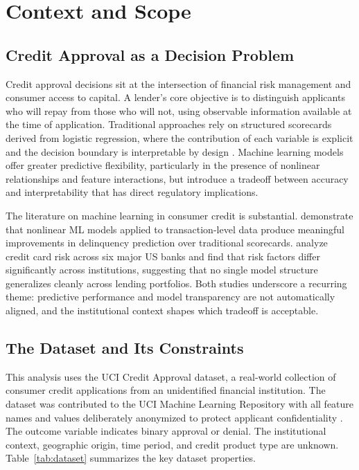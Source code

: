 \documentclass[11pt]{article}
\begin{document}
\newpage

\section{Context and Scope}

\subsection{Credit Approval as a Decision Problem}

Credit approval decisions sit at the intersection of financial risk management and consumer access to capital. A lender's core objective is to distinguish applicants who will repay from those who will not, using observable information available at the time of application. Traditional approaches rely on structured scorecards derived from logistic regression, where the contribution of each variable is explicit and the decision boundary is interpretable by design \citep{khandani2010}. Machine learning models offer greater predictive flexibility, particularly in the presence of nonlinear relationships and feature interactions, but introduce a tradeoff between accuracy and interpretability that has direct regulatory implications.

The literature on machine learning in consumer credit is substantial. \citet{khandani2010} demonstrate that nonlinear ML models applied to transaction-level data produce meaningful improvements in delinquency prediction over traditional scorecards. \citet{butaru2016} analyze credit card risk across six major US banks and find that risk factors differ significantly across institutions, suggesting that no single model structure generalizes cleanly across lending portfolios. Both studies underscore a recurring theme: predictive performance and model transparency are not automatically aligned, and the institutional context shapes which tradeoff is acceptable.

\subsection{The Dataset and Its Constraints}

This analysis uses the UCI Credit Approval dataset, a real-world collection of consumer credit applications from an unidentified financial institution. The dataset was contributed to the UCI Machine Learning Repository with all feature names and values deliberately anonymized to protect applicant confidentiality \citep{quinlan1987}. The outcome variable indicates binary approval or denial. The institutional context, geographic origin, time period, and credit product type are unknown. Table~\ref{tab:dataset} summarizes the key dataset properties.
\end{document}
